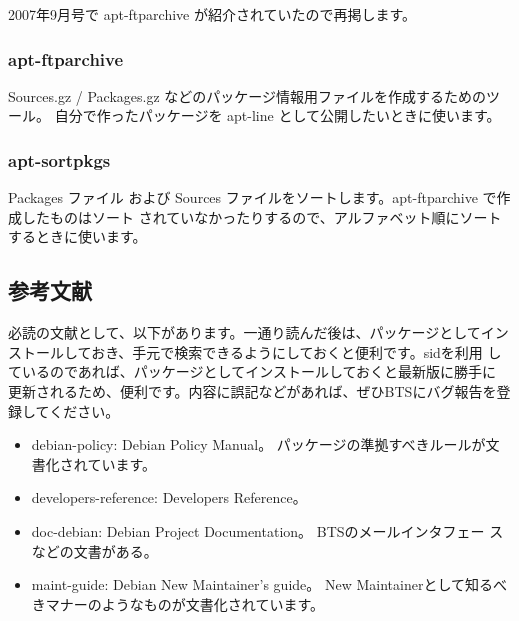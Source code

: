 \documentclass[mingoth,a4paper]{jsarticle}
\begin{document}
2007年9月号で apt-ftparchive が紹介されていたので再掲します。

\subsubsection{apt-ftparchive}
 Sources.gz / Packages.gz などのパッケージ情報用ファイルを作成するためのツール。
 自分で作ったパッケージを apt-line として公開したいときに使います。
\begin{commandline}
\end{commandline}

\subsubsection{apt-sortpkgs}
 Packages ファイル および Sources ファイルをソートします。apt-ftparchive で作成したものはソート
 されていなかったりするので、アルファベット順にソートするときに使います。
\begin{commandline}
\end{commandline} 

 \subsection{参考文献}

 必読の文献として、以下があります。一通り読んだ後は、パッケージとしてイン
 ストールしておき、手元で検索できるようにしておくと便利です。sidを利用
 しているのであれば、パッケージとしてインストールしておくと最新版に勝手に
 更新されるため、便利です。内容に誤記などがあれば、ぜひBTSにバグ報告を登録してください。

 \begin{itemize}
 \item debian-policy: Debian Policy Manual。
       パッケージの準拠すべきルールが文書化されています。
 \item developers-reference: Developers Reference。
       
 \item doc-debian: Debian Project Documentation。 BTSのメールインタフェー
       スなどの文書がある。
 \item maint-guide: Debian New Maintainer's guide。
       New Maintainerとして知るべきマナーのようなものが文書化されています。
 \end{itemize}
\end{document}
